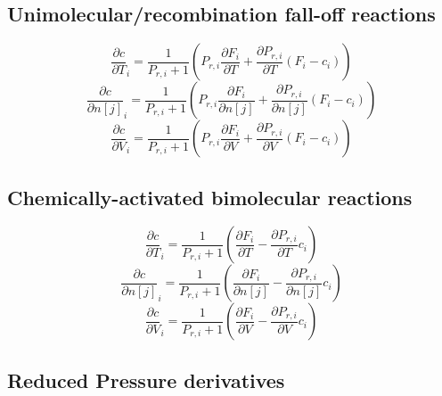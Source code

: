 \documentclass[a4paper,10pt]{article}
\begin{document}
\subsection{Unimolecular/recombination fall-off reactions}
\begin{dmath} \frac{\partial c }{\partial T }_{i} = \frac{1}{P_{r, i} + 1} \left(P_{r, i} \frac{\partial F_{i} }{\partial T } + \frac{\partial P_{r, i} }{\partial T } \left(F_{i} - c_{i}\right)\right)\end{dmath} 
\begin{dmath} \frac{\partial c }{\partial n[j] }_{i} = \frac{1}{P_{r, i} + 1} \left(P_{r, i} \frac{\partial F_{i} }{\partial n[j] } + \frac{\partial P_{r, i} }{\partial n[j] } \left(F_{i} - c_{i}\right)\right)\end{dmath} 
\begin{dmath} \frac{\partial c }{\partial V }_{i} = \frac{1}{P_{r, i} + 1} \left(P_{r, i} \frac{\partial F_{i} }{\partial V } + \frac{\partial P_{r, i} }{\partial V } \left(F_{i} - c_{i}\right)\right)\end{dmath} 
\subsection{Chemically-activated bimolecular reactions}
\begin{dmath} \frac{\partial c }{\partial T }_{i} = \frac{1}{P_{r, i} + 1} \left(\frac{\partial F_{i} }{\partial T } - \frac{\partial P_{r, i} }{\partial T } c_{i}\right)\end{dmath} 
\begin{dmath} \frac{\partial c }{\partial n[j] }_{i} = \frac{1}{P_{r, i} + 1} \left(\frac{\partial F_{i} }{\partial n[j] } - \frac{\partial P_{r, i} }{\partial n[j] } c_{i}\right)\end{dmath} 
\begin{dmath} \frac{\partial c }{\partial V }_{i} = \frac{1}{P_{r, i} + 1} \left(\frac{\partial F_{i} }{\partial V } - \frac{\partial P_{r, i} }{\partial V } c_{i}\right)\end{dmath} 
\subsection{Reduced Pressure derivatives}
\end{document}
